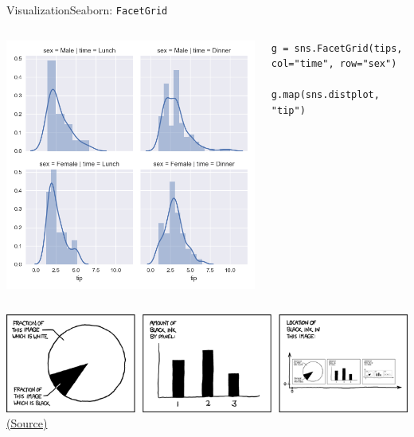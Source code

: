 \documentclass[10pt,compress]{beamer} %
\begin{document}
\begin{frame}[fragile]{Visualization}{Seaborn: \texttt{FacetGrid}}
\begin{columns}
		\includegraphics[width=\textwidth]{figs/sns-facethist2.png}\\
		\begin{exampleblock}{\footnotesize{}}
		\vspace{-0.2cm} 
		\begin{lstlisting}[basicstyle=\tiny]
		g = sns.FacetGrid(tips, col="time", row="sex")
		g.map(sns.distplot, "tip")
		\end{lstlisting}
		\vspace{-0.2cm} 
		\end{exampleblock}
	\end{columns}
\end{frame}

\begin{frame}[plain]
	\begin{center}
		\includegraphics[width=\textwidth]{figs/self_description.png}\\
		\tiny \href{https://xkcd.com/688/}{(Source)}
	\end{center}
\end{frame}
\end{document}
